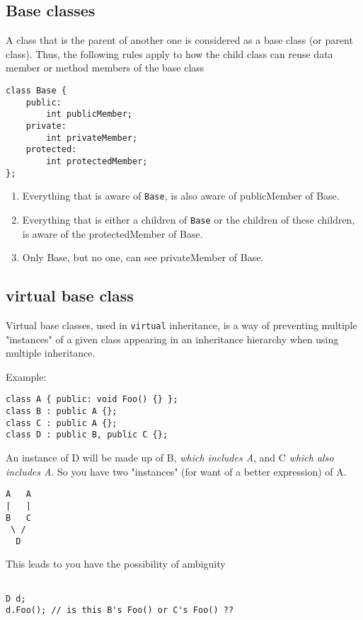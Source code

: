 \subsection{Base classes}

A class that is the parent of another one is considered as a base class (or
parent class). Thus, the following rules apply to how the child class can reuse
data member or method members of the base class
\begin{verbatim}
class Base {
    public:
        int publicMember;
    private:
        int privateMember;
    protected:
        int protectedMember;
};
\end{verbatim}

\begin{enumerate}
  \item  Everything that is aware of \verb!Base!, is also aware of publicMember
  of Base.
  \item Everything that is either a children of \verb!Base! or the children of
  these children, is aware of the protectedMember of Base.
  \item Only Base, but no one, can see privateMember of Base.
\end{enumerate}

\subsection{virtual base class}
\label{sec:virtual_base_class-C++}

Virtual base classes, used in \verb!virtual! inheritance, is a way of preventing
multiple "instances" of a given class appearing in an inheritance hierarchy when
using multiple inheritance.

Example:
\begin{verbatim}
class A { public: void Foo() {} };
class B : public A {};
class C : public A {};
class D : public B, public C {};
\end{verbatim}

An instance of D will be made up of B, {\it which includes A}, and C {\it which also
includes A}. So you have two "instances" (for want of a better expression) of A.
\begin{verbatim}
A   A
|   |
B   C
 \ /
  D
\end{verbatim}
This leads to you have the possibility of ambiguity
\begin{verbatim}

D d;
d.Foo(); // is this B's Foo() or C's Foo() ??

\end{verbatim}

